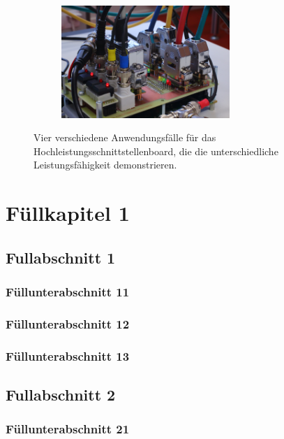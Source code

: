 \documentclass[arbeit=studie,oneside,BCOR=12mm]{ArbeitRST}
\begin{document}
\begin{figure}[ht]
\begin{subfigure}[c]{0.5\textwidth}
\centering
\includegraphics[width=0.7\textwidth]{bild}
\end{subfigure}
\caption{Vier verschiedene Anwendungsfälle für das Hochleistungsschnittstellenboard, die die unterschiedliche Leistungsfähigkeit demonstrieren.}
\end{figure}

\Blindtext[3][2]



\chapter{Füllkapitel 1}
\section{Fullabschnitt 1}
\subsection{Füllunterabschnitt 11}
\Blindtext[1][1]
\subsection{Füllunterabschnitt 12}
\Blindtext[1][1]
\subsection{Füllunterabschnitt 13}
\Blindtext[1][1]


\section{Fullabschnitt 2}
\subsection{Füllunterabschnitt 21}
\Blindtext[1][1]
\end{document}
